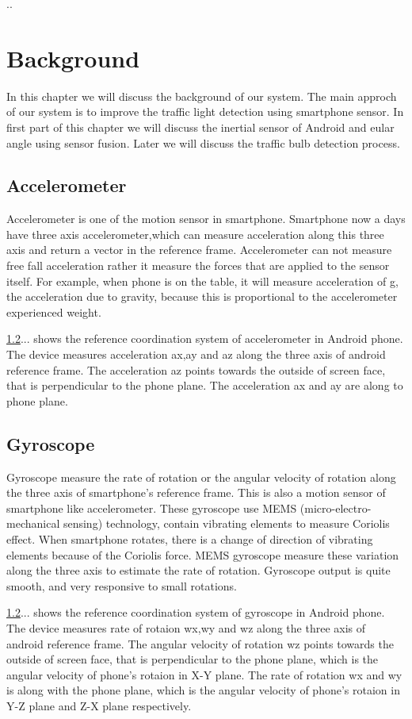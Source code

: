 ..\chapter{Background}
In this chapter we will discuss the background of our system.
The main approch of our system is to improve the traffic light detection using smartphone sensor.
In first part of this chapter we will discuss the inertial sensor of Android and eular angle using sensor fusion.
Later we will discuss the traffic bulb detection process.

\section{Accelerometer}
Accelerometer is one of the motion sensor in smartphone.
Smartphone now a days have three axis accelerometer,which can measure acceleration along this three axis and return a vector in the reference frame.
Accelerometer can not measure free fall acceleration rather it measure the forces that are applied to the sensor itself.
For example, when phone is on the table, it will measure acceleration of g, the acceleration due to gravity, because this is proportional to the accelerometer experienced weight.

\ref{}... shows the reference coordination system of accelerometer in Android phone.
The device measures acceleration ax,ay and az along the three axis of android reference frame.
The acceleration az points towards the outside of screen face, that is perpendicular to the phone plane.
The acceleration ax and ay are along to phone plane.

\section{Gyroscope}
Gyroscope measure the rate of rotation or the angular velocity of rotation along the three axis of smartphone's reference frame.
This is also a motion sensor of smartphone like accelerometer.
These gyroscope use MEMS (micro-electro-mechanical sensing) technology, contain vibrating elements to measure Coriolis effect.
When smartphone rotates, there is a change of direction of vibrating elements because of the Coriolis force.
MEMS gyroscope measure these variation along the three axis to estimate the rate of rotation.
Gyroscope output is quite smooth, and very responsive to small rotations.

\ref{}... shows the reference coordination system of gyroscope in Android phone.
The device measures rate of rotaion wx,wy and wz along the three axis of android reference frame.
The angular velocity of rotation wz points towards the outside of screen face, that is perpendicular to the phone plane, which is the angular velocity of phone's rotaion in X-Y plane.
The rate of rotation wx and wy is along with the phone plane, which is the angular velocity of phone's rotaion in Y-Z plane and Z-X plane respectively.

